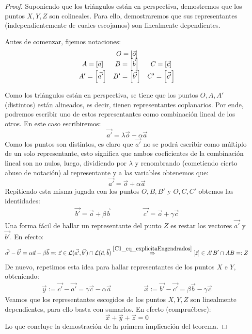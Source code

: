 \begin{proof}
	Suponiendo que los triángulos están en perspectiva, demostremos que los puntos $X,Y,Z$ son colineales. Para ello, demostraremos que sus representantes (independientemente de cuales escojamos) son linealmente dependientes.
	
	Antes de comenzar, fijemos notaciones:
	\[\begin{array}{ccc}
	& O=\left [ \vec{o} \right ] & \\
	A=\left [ \vec{a} \right ]   & B=\left [ \vec{b} \right ]   & C=\left [ \vec{c} \right ]\\
	A'=\left [ \vec{a'} \right ] & B'=\left [ \vec{b'} \right ] & C'=\left [ \vec{c'} \right ] 
	\end{array}\]
	
	Como los triángulos están en perspectiva, se tiene que los puntos $O,A,A'$ (distintos) están alineados, es decir, tienen representantes coplanarios. Por ende, podremos escribir uno de estos representantes como combinación lineal de los otros. En este caso escribiremos:
	\[\vec{a'}=\lambda \vec{o}+\alpha\vec{a}\]
	Como los puntos son distintos, es claro que $\vec{a'}$ no se podrá escribir como múltiplo de un solo representante, esto significa que ambos coeficientes de la combinación lineal son no nulos, luego, dividiendo por $\lambda$ y renombrando (cometiendo cierto abuso de notación) al representante y a las variables obtenemos que:
	\[\vec{a'}=\vec{o}+\alpha\vec{a}\]
	Repitiendo esta misma jugada con los puntos $O,B,B'$ y $O,C,C'$ obtemos las identidades:
	\[\begin{array}{lr}
	\vec{b'}=\vec{o}+\beta\vec{b} \qquad&\qquad
	\vec{c'}=\vec{o}+\gamma\vec{c}
	\end{array}\]
	Una forma fácil de hallar un representante del punto $Z$ es restar los vectores $\vec{a'}$ y $\vec{b'}$. En efecto:
	\[\vec{a'}-\vec{b'}=\alpha\vec{a}-\beta\vec{b}=:\vec{z}\in\mathcal{L}(\vec{a'},\vec{b'})\cap\mathcal{L}(\vec{a},\vec{b})\stackrel{\eqref{C1_eq_explicitaEngendrados}}{\Rightarrow}\left [ \vec{z} \right ]\in A'B'\cap AB=:Z\]
	De nuevo, repetimos esta idea para hallar representantes de los puntos $X$ e $Y$, obteniendo:
	\[\begin{array}{lr}
	\vec{y}:=\vec{c'}-\vec{a'}=\gamma\vec{c}-\alpha\vec{a}\qquad&
	\qquad \vec{x}:=\vec{b'}-\vec{c'}=\beta\vec{b}-\gamma\vec{c}
	\end{array}\]
	Veamos que los representantes escogidos de los puntos $X,Y,Z$ son linealmente dependientes, para ello basta con sumarlos. En efecto (compruébese):
	\[\vec{x}+\vec{y}+\vec{z}=0\]
	Lo que concluye la demostración de la primera implicación del teorema.
	

\end{proof}

